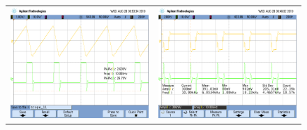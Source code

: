 \begin{figure}[H]
	\centering
	\begin{tabular}{c c}
		\includegraphics[scale=0.2]{Derivador/Mediciones/Osciloscopio/PCB_Sin_Compensar/scope_11.png} &
		\includegraphics[scale=0.2]{Derivador/Mediciones/Osciloscopio/PCB_Sin_Compensar/scope_3.png} \\

\end{tabular}
\end{figure}
